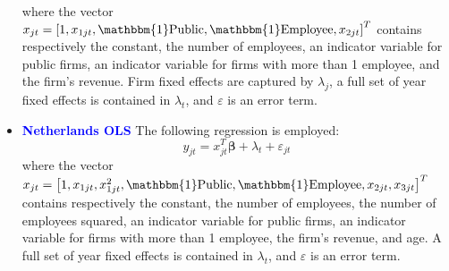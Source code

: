 \documentclass[12pt,notitlepage]{article}
\newcommand{\sym}[1] {\ifmmode^{#1} \else\(^{#1}\) \fi}
\begin{document}
\begin{itemize}
\begin{equation}
	\end{equation}
where the vector $x_{jt} = \left[  1, x_{1jt}, \mathbbm{1}\text{Public}, \mathbbm{1}\text{Employee}, x_{2jt} \right]^{T} $ contains respectively the constant, the number of employees, an indicator variable for public firms, an indicator variable for firms with more than 1 employee, and the firm's revenue. Firm fixed effects are captured by $\lambda_{j}$, a full set of year fixed effects is contained in $\lambda_{t}$, and $\varepsilon$ is an error term.\begin{table}[htbp]\centering
\def\sym#1{\ifmmode^{#1}\else\(^{#1}\)\fi}
\caption{Haltiwanger growth rate}
\end{table}
\clearpage




\item \textcolor{blue}{\textbf{Netherlands OLS}}
The following regression is employed:
	\begin{equation}
	y_{jt} = x^{T}_{jt}\mathbf{\beta} + \lambda_{t} + \varepsilon_{jt}
	\end{equation}
where the vector $x_{jt} = \left[  1, x_{1jt}, x^{2}_{1jt}, \mathbbm{1}\text{Public}, \mathbbm{1}\text{Employee}, x_{2jt}, x_{3jt}  \right]^{T} $ contains respectively the constant, the number of employees, the number of employees squared, an indicator variable for public firms, an indicator variable for firms with more than 1 employee, the firm's revenue, and age. A full set of year fixed effects is contained in $\lambda_{t}$, and $\varepsilon$ is an error term.
\begin{table}[htbp]\centering
\def\sym#1{\ifmmode^{#1}\else\(^{#1}\)\fi}
\caption{Haltiwanger growth rate}
\end{table}
\clearpage


\end{itemize}
\end{document}
